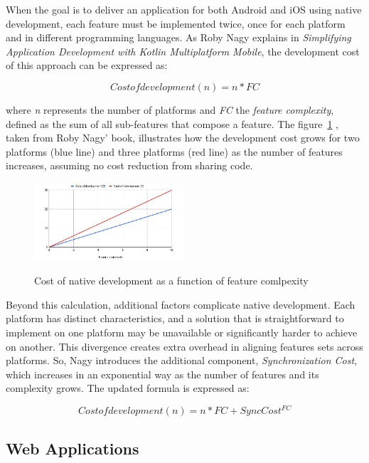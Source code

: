 When the goal is to deliver an application for both Android and iOS using native development, each feature must be implemented twice, once for each platform and in different programming languages.
As Roby Nagy explains in \textit{Simplifying Application Development with Kotlin Multiplatform Mobile}\cite{Nagy2022}, the development cost of this approach can be expressed as:


\[Cost of development (n) = n * FC\]

where \textit{n} represents the number of platforms and \textit{FC} the \textit{feature complexity}, defined as the sum of all sub-features that compose a feature.
The figure~\ref{fig:costNative} , taken from Roby Nagy' book\cite{Nagy2022}, illustrates how the development cost grows for two platforms (blue line) and three platforms (red line) as the number of features increases, assuming no cost reduction from sharing code.

\begin{figure}[h]
    \caption{Cost of native development as a function of feature comlpexity \cite{Nagy2022}}
    \centering
    \includegraphics[width=0.5\textwidth]{figs/Figure_1.1_B17614_cost_of_native_dev}
    \label{fig:costNative}
\end{figure}


Beyond this calculation, additional factors complicate native development.
Each platform has distinct characteristics, and a solution that is straightforward to implement on one platform may be unavailable or significantly harder to achieve on another.
This divergence creates extra overhead in aligning features sets across platforms.
So, Nagy introduces the additional component, \textit{Synchronization Cost}, which increases in an exponential way as the number of features and its complexity grows.
The updated formula is expressed as:

\[Cost of development (n) = n * FC + Sync Cost ^ {FC}\]


\subsection{Web Applications}\label{subsec:web-applications}

